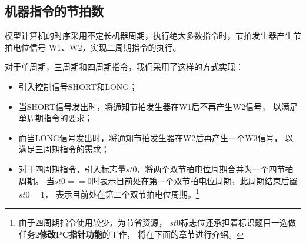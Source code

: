\subsection{机器指令的节拍数}
\tec 模型计算机的时序采用不定长机器周期，执行绝大多数指令时，节拍发生器产生节拍电位信号
W1、W2，实现二周期指令的执行。
\par
对于单周期，三周期和四周期指令，我们采用了这样的方式实现：
\begin{itemize}
    \item 引入控制信号SHORT和LONG；
    \item 当SHORT信号发出时，将通知节拍发生器在W1后不再产生W2信号，
    以满足单周期指令的要求；
    \item 而当LONG信号发出时，将通知节拍发生器在W2后再产生一个W3信号，
    以满足三周期指令的需求；
    \item 对于四周期指令，引入标志量$st0$，将两个双节拍电位周期合并为一个四节拍周期。
    当$st0==0$时表示目前处在第一个双节拍电位周期，此周期结束后置$st0=1$，
    表示目前处在第二个双节拍电位周期。\footnote{由于四周期指令使用较少，为节省资源，
    $st0$标志位还承担着标识题目一选做任务2\textbf{修改PC指针功能}的工作，
    将在下面的章节进行介绍。}
\end{itemize}